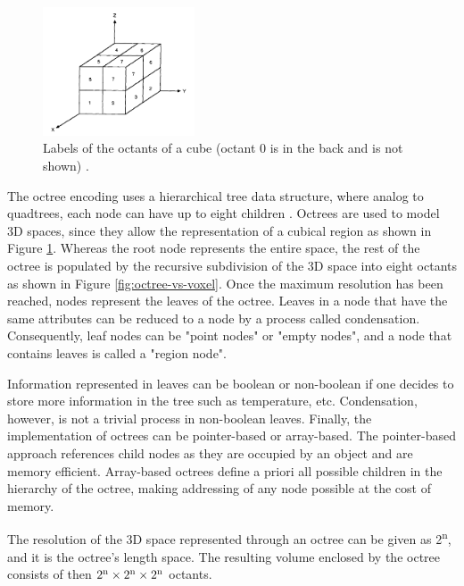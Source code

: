 \begin{figure}[!ht]
        \centering
        \includegraphics[width=0.4\textwidth]{images/octree.png}
        \caption{Labels of the octants of a cube (octant 0 is in the back and is not shown) \cite{chen1988survey}.
        }
        \label{fig:octree}
\end{figure}


The octree encoding uses a hierarchical tree data structure, where analog to quadtrees, each node can have up to eight children  \cite{meagher1980octree}. Octrees are used to model 3D spaces, since they allow the representation of a cubical region as shown in Figure \ref{fig:octree}. Whereas the root node represents the entire space, the rest of the octree is populated by the recursive subdivision of the 3D space into eight octants as shown in Figure \ref{fig:octree-vs-voxel}. Once the maximum resolution has been reached, nodes represent the leaves of the octree. Leaves in a node that have the same attributes can be reduced to a node by a process called condensation.
Consequently, leaf nodes can be "point nodes" or "empty nodes", and a node that contains leaves is called a "region node".

Information represented in leaves can be boolean or non-boolean if one decides to store more information in the tree such as temperature, etc. Condensation, however, is not a trivial process in non-boolean leaves. Finally, the implementation of octrees can be pointer-based or array-based. The pointer-based approach references child nodes as they are occupied by an object and are memory efficient. Array-based octrees define a priori all possible children in the hierarchy of the octree, making addressing of any node possible at the cost of memory.

 The resolution of the 3D space represented through an octree can be given as 2\textsuperscript{n}, and it is the octree's length space. The resulting volume enclosed by the octree consists of then $2\textsuperscript{n}\times2\textsuperscript{n}\times2\textsuperscript{n}$ octants. 


